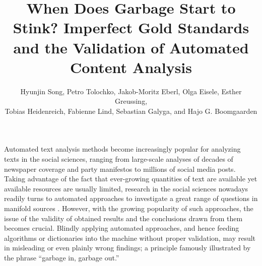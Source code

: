 \documentclass[man, 12pt, a4paper, nolmodern, noextraspace]{apa6}
\title{When Does Garbage Start to Stink? Imperfect Gold Standards and the Validation of Automated Content Analysis}
\author{\addvspace{.25in} Hyunjin Song, Petro Tolochko, Jakob-Moritz Eberl, Olga Eisele, Esther Greussing, \\
        Tobias Heidenreich, Fabienne Lind, Sebastian Galyga, and Hajo G. Boomgaarden}
\affiliation{Department of Communication, University of Vienna, Austria}
\begin{document}
    
\setcounter{page}{0}
\maketitle

    Automated text analysis methods become increasingly popular for analyzing texts in the social sciences, ranging from large-scale analyses of decades of newspaper coverage and party manifestos to millions of social media posts. Taking advantage of the fact that ever-growing quantities of text are available yet available resources are usually limited, research in the social sciences nowadays readily turns to automated approaches to investigate a great range of questions in manifold sources \parencite{Boumans_Trilling_2016, grimmer2013text}. However, with the growing popularity of such approaches, the issue of the validity of obtained results and the conclusions drawn from them becomes crucial. Blindly applying automated approaches, and hence feeding algorithms or dictionaries into the machine without proper validation, may result in misleading or even plainly wrong findings; a principle famously illustrated by the phrase \enquote{garbage in, garbage out.}
    
\end{document}
